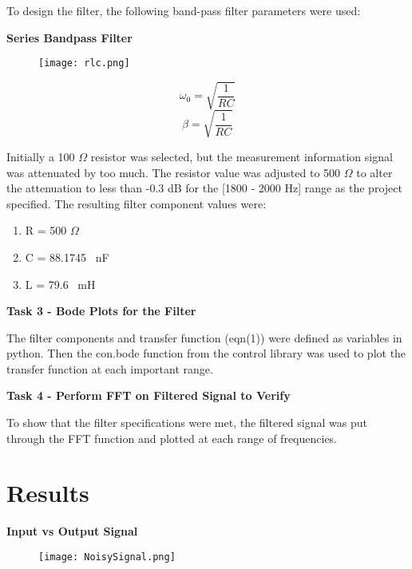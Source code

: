 \documentclass[hidelinks, 12pt]{report}
\begin{document}
    To design the filter, the following band-pass filter parameters were used: 
    
    \textbf{Series Bandpass Filter}
    
    \begin{figure}[!h]
    \centering
    \texttt{[image: rlc.png]}
    \end{figure}
    \begin{equation*}
        \omega_0 = \sqrt{\frac{1}{RC}}
    \end{equation*}
    \begin{equation*}
        \beta = \sqrt{\frac{1}{RC}}
    \end{equation*}
    
    Initially a 100 $\Omega$ resistor was selected, but the measurement information signal was attenuated by too much. The resistor value was adjusted to 500 $\Omega$ to alter the attenuation to less than -0.3 dB for the [1800 - 2000 Hz] range as the project specified. The resulting filter component values were: 
    
    \begin{enumerate}
        \item R = 500 $\Omega$
        \item C = 88.1745 \  nF
        \item L = 79.6 \  mH 
    \end{enumerate}
    
    \textbf{Task 3 - Bode Plots for the Filter}
    
    The filter components and transfer function (eqn(1)) were defined as variables in python. Then the con.bode function from the control library was used to plot the transfer function at each important range.
    
    \textbf{Task 4 - Perform FFT on Filtered Signal to Verify}
    
    To show that the filter specifications were met, the filtered signal was put through the FFT function and plotted at each range of frequencies.
    
\section{Results}
\textbf{Input vs Output Signal}

    \begin{figure}[!h]
    \centering
    \texttt{[image: NoisySignal.png]}
    \end{figure}
    
\end{document}
